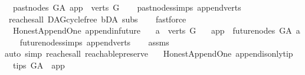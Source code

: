 \begin{isabellebody}
\ \ {\isachardoublequoteopen}past{\isacharunderscore}{\kern0pt}nodes\ G{\isacharunderscore}{\kern0pt}A\ app\ {\isacharequal}{\kern0pt}\ verts\ G{\isachardoublequoteclose}\isanewline
%
\isadelimproof
\ \ %
\endisadelimproof
%
\isatagproof
{}\isamarkupfalse%
\ past{\isacharunderscore}{\kern0pt}nodes{\isachardot}{\kern0pt}simps\ append{\isacharunderscore}{\kern0pt}verts\ \isanewline
\ \ \isamarkupfalse%
\ reaches{\isacharunderscore}{\kern0pt}all\ DAG{\isachardot}{\kern0pt}cycle{\isacharunderscore}{\kern0pt}free\ bD{\isacharunderscore}{\kern0pt}A\ subs\isanewline
\ \ \isamarkupfalse%
\ fastforce%
\endisatagproof
{\isafoldproof}%
%
\isadelimproof
\ \isanewline
%
\endisadelimproof
\isanewline
\isanewline
\isanewline
{}\isamarkupfalse%
\ {\isacharparenleft}{\kern0pt}\ Honest{\isacharunderscore}{\kern0pt}Append{\isacharunderscore}{\kern0pt}One{\isacharparenright}{\kern0pt}\ append{\isacharunderscore}{\kern0pt}in{\isacharunderscore}{\kern0pt}future{\isacharcolon}{\kern0pt}\isanewline
\ \ \ {\isachardoublequoteopen}a\ {\isasymin}\ verts\ G{\isachardoublequoteclose}\isanewline
\ \ \ {\isachardoublequoteopen}app\ {\isasymin}\ future{\isacharunderscore}{\kern0pt}nodes\ G{\isacharunderscore}{\kern0pt}A\ a{\isachardoublequoteclose}\isanewline
%
\isadelimproof
\ \ %
\endisadelimproof
%
\isatagproof
{}\isamarkupfalse%
\ future{\isacharunderscore}{\kern0pt}nodes{\isachardot}{\kern0pt}simps\ append{\isacharunderscore}{\kern0pt}verts\isanewline
\ \ \isamarkupfalse%
\ assms\isanewline
{}\isamarkupfalse%
{\isacharparenleft}{\kern0pt}auto\ simp{\isacharcolon}{\kern0pt}\ reaches{\isacharunderscore}{\kern0pt}all\ reachable{}{\isacharunderscore}{\kern0pt}preserve{\isacharparenright}{\kern0pt}\ \isamarkupfalse%
%
\endisatagproof
{\isafoldproof}%
%
\isadelimproof
\isanewline
%
\endisadelimproof
\isanewline
{}\isamarkupfalse%
\ {\isacharparenleft}{\kern0pt}\ Honest{\isacharunderscore}{\kern0pt}Append{\isacharunderscore}{\kern0pt}One{\isacharparenright}{\kern0pt}\ append{\isacharunderscore}{\kern0pt}is{\isacharunderscore}{\kern0pt}only{\isacharunderscore}{\kern0pt}tip{\isacharcolon}{\kern0pt}\isanewline
\ \ {\isachardoublequoteopen}tips\ G{\isacharunderscore}{\kern0pt}A\ {\isacharequal}{\kern0pt}\ {\isacharbraceleft}{\kern0pt}app{\isacharbraceright}{\kern0pt}{\isachardoublequoteclose}\isanewline
%
\isadelimproof
%
\endisadelimproof
%
\isatagproof
{}\isamarkupfalse%

\end{isabellebody}
